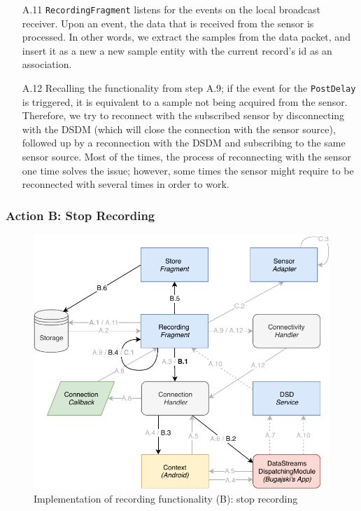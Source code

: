 \begin{itemize}
    \item[A.11] \verb|RecordingFragment| listens for the events on the local broadcast receiver. Upon an event, the data that is received from the sensor is processed. In other words, we extract the samples from the data packet, and insert it as a new a new sample entity with the current record's id as an association. 
    \item[A.12] Recalling the functionality from step A.9; if the event for the \verb|PostDelay| is triggered, it is equivalent to a sample not being acquired from the sensor. Therefore, we try to reconnect with the subscribed sensor by disconnecting with the DSDM (which will close the connection with the sensor source), followed up by a reconnection with the DSDM and subscribing to the same sensor source. Most of the times, the process of reconnecting with the sensor one time solves the issue; however, some times the sensor might require to be reconnected with several times in order to work. 
\end{itemize}

\subsubsection{Action B: Stop Recording}
\begin{figure}
    \centering
    \includegraphics[scale=0.7]{images/Recording_ImpB.pdf}
    \caption{Implementation of recording functionality (B): stop recording}
    \label{fig:impl_recordingB}
\end{figure}

